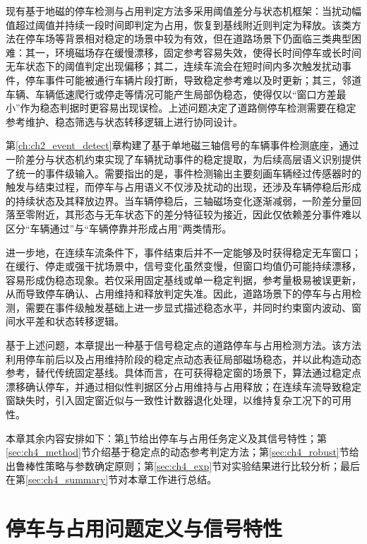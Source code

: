 \documentclass{xdupgthesis}
\begin{document}
现有基于地磁的停车检测与占用判定方法多采用阈值差分与状态机框架：当扰动幅值超过阈值并持续一段时间即判定为占用，恢复到基线附近则判定为释放。该类方法在停车场等背景相对稳定的场景中较为有效，但在道路场景下仍面临三类典型困难：其一，环境磁场存在缓慢漂移，固定参考容易失效，使得长时间停车或长时间无车状态下的阈值判定出现偏移；其二，连续车流会在短时间内多次触发扰动事件，停车事件可能被通行车辆片段打断，导致稳定参考难以及时更新；其三，邻道车辆、车辆低速爬行或停走等情况可能产生局部伪稳态，使得仅以“窗口方差最小”作为稳态判据时更容易出现误检。上述问题决定了道路侧停车检测需要在稳定参考维护、稳态筛选与状态转移逻辑上进行协同设计。

第\ref{ch:ch2_event_detect}章构建了基于单地磁三轴信号的车辆事件检测底座，通过一阶差分与状态机约束实现了车辆扰动事件的稳定提取，为后续高层语义识别提供了统一的事件级输入。需要指出的是，事件检测输出主要刻画车辆经过传感器时的触发与结束过程，而停车与占用语义不仅涉及扰动的出现，还涉及车辆停稳后形成的持续状态及其释放边界。当车辆停稳后，三轴磁场变化逐渐减弱，一阶差分量回落至零附近，其形态与无车状态下的差分特征较为接近，因此仅依赖差分事件难以区分“车辆通过”与“车辆停靠并形成占用”两类情形。

进一步地，在连续车流条件下，事件结束后并不一定能够及时获得稳定无车窗口；在缓行、停走或强干扰场景中，信号变化虽然变慢，但窗口均值仍可能持续漂移，容易形成伪稳态现象。若仅采用固定基线或单一稳定判据，参考量极易被误更新，从而导致停车确认、占用维持和释放判定失准。因此，道路场景下的停车与占用检测，需要在事件级触发基础上进一步显式描述稳态水平，并同时约束窗内波动、窗间水平差和状态转移逻辑。

基于上述问题，本章提出一种基于信号稳定点的道路停车与占用检测方法。该方法利用停车前后以及占用维持阶段的稳定点动态表征局部磁场稳态，并以此构造动态参考，替代传统固定基线。具体而言，在可获得稳定窗的场景下，算法通过稳定点漂移确认停车，并通过相似性判据区分占用维持与占用释放；在连续车流导致稳定窗缺失时，引入固定窗近似与一致性计数器退化处理，以维持复杂工况下的可用性。

本章其余内容安排如下：第\ref{sec:ch4_problem}节给出停车与占用任务定义及其信号特性；第\ref{sec:ch4_method}节介绍基于稳定点的动态参考判定方法；第\ref{sec:ch4_robust}节给出鲁棒性策略与参数确定原则；第\ref{sec:ch4_exp}节对实验结果进行比较分析；最后在第\ref{sec:ch4_summary}节对本章工作进行总结。


\section{停车与占用问题定义与信号特性}
\label{sec:ch4_problem}
\end{document}
